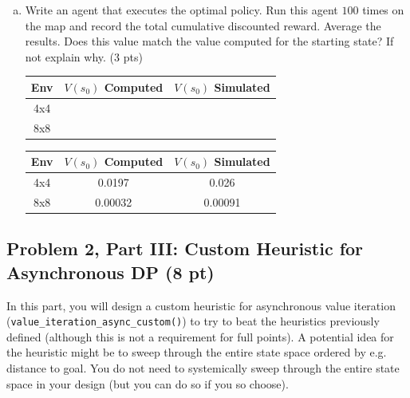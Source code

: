 \documentclass[12pt]{article}
\begin{document}
\begin{enumerate}[a)]
\item Write an agent that executes the optimal policy. Run this agent $100$ times on the map and record the total cumulative discounted reward. Average the results. Does this value match the value computed for the starting state? If not explain why. (3 pts)
  
\begin{center}
  \begin{tabular}{|c|c|c|}\hline
    {\bf Env} & {\bf $V(s_0)$ Computed} & {\bf $V(s_0)$ Simulated}  \\ \hline
    4x4  &  &  \\ \hline
    8x8  &  &  \\ \hline
  \end{tabular}
\end{center}

\begin{solution}
\begin{center}
  \begin{tabular}{|c|c|c|}\hline
    {\bf Env} & {\bf $V(s_0)$ Computed} & {\bf $V(s_0)$ Simulated}  \\ \hline
    4x4  &  0.0197 &  0.026 \\ \hline
    8x8  &  0.00032 &  0.00091 \\ \hline
  \end{tabular}
\end{center}
\end{solution}
  
\end{enumerate}


\subsection*{Problem 2, Part III: Custom Heuristic for Asynchronous DP (8 pt)}

In this part, you will design a custom heuristic for asynchronous value iteration\\
(\texttt{value\_iteration\_async\_custom()}) to try to beat the heuristics previously defined (although this is not a requirement for full points). A potential idea for the heuristic might be to sweep through the entire state space ordered by e.g. distance to goal. You do not need to systemically sweep through the entire state space in your design (but you can do so if you so choose).
\end{document}
